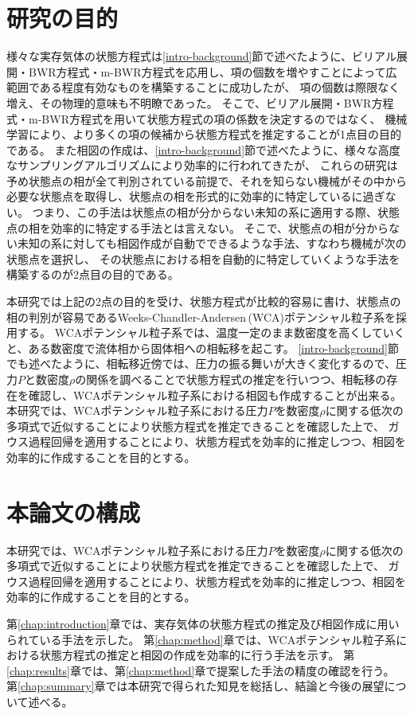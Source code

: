 \documentclass[titlepage]{jsreport}
\begin{document}
\section{研究の目的} \label{intro-purpose}
様々な実存気体の状態方程式は\ref{intro-background}節で述べたように、ビリアル展開・BWR方程式・m-BWR方程式を応用し、項の個数を増やすことによって広範囲である程度有効なものを構築することに成功したが、
項の個数は際限なく増え、その物理的意味も不明瞭であった。
そこで、ビリアル展開・BWR方程式・m-BWR方程式を用いて状態方程式の項の係数を決定するのではなく、
機械学習により、より多くの項の候補から状態方程式を推定することが1点目の目的である。
また相図の作成は、\ref{intro-background}節で述べたように、様々な高度なサンプリングアルゴリズムにより効率的に行われてきたが、
これらの研究は予め状態点の相が全て判別されている前提で、それを知らない機械がその中から必要な状態点を取得し、状態点の相を形式的に効率的に特定しているに過ぎない。
つまり、この手法は状態点の相が分からない未知の系に適用する際、状態点の相を効率的に特定する手法とは言えない。
そこで、状態点の相が分からない未知の系に対しても相図作成が自動でできるような手法、すなわち機械が次の状態点を選択し、
その状態点における相を自動的に特定していくような手法を構築するのが2点目の目的である。

本研究では上記の2点の目的を受け、状態方程式が比較的容易に書け、状態点の相の判別が容易であるWeeks-Chandler-Andersen\,(WCA)ポテンシャル粒子系を採用する。
WCAポテンシャル粒子系では、温度一定のまま数密度を高くしていくと、ある数密度で流体相から固体相への相転移を起こす。
\ref{intro-background}節でも述べたように、相転移近傍では、圧力の振る舞いが大きく変化するので、圧力$P$と数密度$\rho$の関係を調べることで状態方程式の推定を行いつつ、相転移の存在を確認し、WCAポテンシャル粒子系における相図も作成することが出来る。
本研究では、WCAポテンシャル粒子系における圧力$P$を数密度$\rho$に関する低次の多項式で近似することにより状態方程式を推定できることを確認した上で、
ガウス過程回帰を適用することにより、状態方程式を効率的に推定しつつ、相図を効率的に作成することを目的とする。


\section{本論文の構成} \label{intro-constitution}
本研究では、WCAポテンシャル粒子系における圧力$P$を数密度$\rho$に関する低次の多項式で近似することにより状態方程式を推定できることを確認した上で、
ガウス過程回帰を適用することにより、状態方程式を効率的に推定しつつ、相図を効率的に作成することを目的とする。

第\ref{chap:introduction}章では、実存気体の状態方程式の推定及び相図作成に用いられている手法を示した。
第\ref{chap:method}章では、WCAポテンシャル粒子系における状態方程式の推定と相図の作成を効率的に行う手法を示す。
第\ref{chap:results}章では、第\ref{chap:method}章で提案した手法の精度の確認を行う。
第\ref{chap:summary}章では本研究で得られた知見を総括し、結論と今後の展望について述べる。
\end{document}
